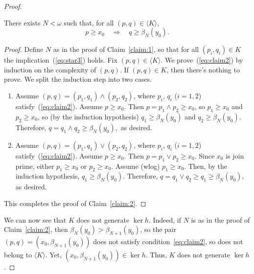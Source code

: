 \begin{proof}
\begin{claim}
  \label{claim:2}
  There exists $N < \omega$ such that, for all $(p, q) \in \langle K \rangle$,
\begin{equation}
  \label{eq:claim2}
p \geqslant x_0 \quad \Longrightarrow \quad q \geqslant \beta_N(y_0).
\end{equation}
\end{claim}
\begin{proof} Define $N$ as in the proof of Claim~\ref{claim:1}, so that 
for all $(p_i,q_i) \in K$ the implication~(\ref{eq:star3}) holds. Fix $(p, q) \in \langle K \rangle$. We prove~(\ref{eq:claim2}) by induction on the complexity of $(p, q)$.  If $(p, q) \in K$, then there's nothing to prove.
We split the induction step into two cases.
\begin{enumerate}
\item Assume $(p, q) = (p_1, q_1) \wedge (p_2, q_2)$, where $p_i$, $q_i$ ($i = 1, 2$) satisfy~(\ref{eq:claim2}).  Assume $p\geqslant x_0$. %
  Then $p = p_1 \wedge p_2 \geqslant x_0$, so $p_1 \geqslant x_0$ and $p_2 \geqslant x_0$, so (by the induction hypothesis) $q_1\geqslant \beta_N(y_0)$ and $q_2\geqslant \beta_N(y_0).$ Therefore, $q = q_1 \wedge q_2 \geqslant \beta_N(y_0),$ as desired.
\item Assume $(p, q) = (p_1, q_1) \vee (p_2, q_2)$, where $p_i$, $q_i$ ($i = 1, 2$) 
satisfy~(\ref{eq:claim2}). Assume $p\geqslant x_0$. Then $p = p_1 \vee p_2 \geqslant x_0$.  
Since $x_0$ is join prime, either $p_1 \geqslant x_0$ or $p_2 \geqslant x_0$.  
Assume (wlog) $p_1 \geqslant x_0$. Then, by the induction hypothesis, $q_1\geqslant \beta_N(y_0)$.
Therefore, $q = q_1 \vee q_2 \geqslant q_1 \geqslant \beta_N(y_0),$ as desired.
\end{enumerate}
This completes the proof of Claim~\ref{claim:2}.
\end{proof}
We can now see that $K$ does not generate $\ker h$. Indeed, 
if $N$ is as in the proof of Claim~\ref{claim:2}, then $\beta_{N}(y_0) > \beta_{N+1}(y_0)$, 
so the pair $(p, q) = (x_0, \beta_{N+1}(y_0))$ does not 
satisfy condition~\ref{eq:claim2}, so does not belong to $\langle K\rangle$.
Yet, $(x_0, \beta_{N+1}(y_0)) \in \ker h$. Thus, $K$ does not generate $\ker h$.  
\end{proof}

